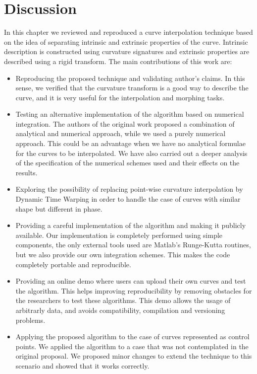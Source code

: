 \documentclass{ipol}
\begin{document}
\section{Discussion}\label{sec:curve_interpolation:discussion}

In this chapter we reviewed and reproduced a curve interpolation technique based on the idea of separating intrinsic and extrinsic properties of the curve. Intrinsic description is constructed using curvature signatures and extrinsic properties are described using a rigid transform.
The main contributions of this work are:
\begin{itemize}
	\item Reproducing the proposed technique and validating author's claims. In this sense, we verified that the curvature transform is a good way to describe the curve, and it is very useful for the interpolation and morphing tasks.
	\item Testing an alternative implementation of the algorithm based on numerical integration. The authors of the original work proposed a combination of analytical and numerical approach, while we used a purely numerical approach. This could be an advantage when we have no analytical formulae for the curves to be interpolated.
	We have also carried out a deeper analysis of the specification of the numerical schemes used and their effects on the results. 
	\item Exploring the possibility of replacing point-wise curvature interpolation by Dynamic Time Warping in order to handle the case of curves with similar shape but different in phase.
	\item Providing a careful implementation of the algorithm and making it publicly available. Our implementation is completely performed using simple components, the only external tools used are Matlab's Runge-Kutta routines, but we also provide our own integration schemes. This makes the code completely portable and reproducible.
	\item Providing an online demo where users can upload their own curves and test the algorithm. This helps improving reproducibility by removing obstacles for the researchers to test these algorithms. This demo allows the usage of arbitrarly data, and avoids compatibility, compilation and versioning problems.
	\item Applying the proposed algorithm to the case of curves represented as control points. We applied the algorithm to a case that was not contemplated in the original proposal. We proposed minor changes to extend the technique to this scenario and showed that it works correctly.
\end{itemize}
\end{document}
